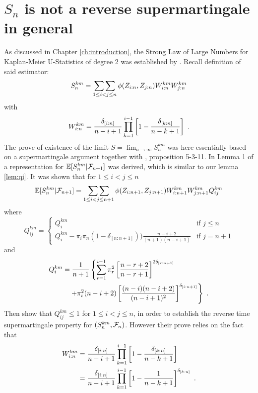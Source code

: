 \section{$S_n$ is not a reverse supermartingale in general} \label{sec:not_supermart}
As discussed in Chapter \ref{ch:introduction}, the Strong Law of Large Numbers for Kaplan-Meier U-Statistics of degree $2$ was established by \cite{bose1999strong}. Recall definition of said estimator: 
\begin{equation*}
	S_n^{km} = \mathop{\sum\sum}\limits_{1\leq i<j\leq n} \phi(Z_{i:n}, Z_{j:n}) W_{i:n}^{km} W_{j:n}^{km}
\end{equation*}
with
\begin{equation*}
	W_{i:n}^{km} = \frac{\delta_{[i:n]}}{n-i+1}\prod\limits_{k=1}^{i-1}\left[1-\frac{\delta_{[k:n]}}{n-k+1}\right]\textrm{ .}
\end{equation*}
The prove of existence of the limit $S = \lim_{n\to\infty} S_n^{km}$ was here essentially based on a supermartingale argument together with \cite{neveu1975discrete}, proposition 5-3-11. In Lemma 1 of \cite{bose1999strong} a representation for $\mathbb{E}[S_n^{km}| \mathcal{F}_{n+1}]$ was derived, which is similar to our lemma \ref{lem:qi}. It was shown that for $1\leq i<j\leq n$
$$\mathbb{E}[S_n^{km}|\mathcal{F}_{n+1}] = \mathop{\sum\sum}\limits_{1\leq i<j \leq n+1} \phi(Z_{i:n+1},Z_{j:n+1}) W_{i:n+1}^{km}W_{j:n+1}^{km}Q_{ij}^{km}$$
where 
\[Q_{ij}^{km} = \begin{cases} 
Q_i^{km} &\textrm{if } j\leq n \\
Q_i^{km} - \pi_i \pi_n (1-\delta_{[n:n+1]}))\frac{n-i+2}{(n+1)(n-i+1)} &\textrm{if } j=n+1
\end{cases}
\]
and
\begin{align*}
Q_i^{km} &= \frac{1}{n+1} \left\{ \sum\limits_{r=1}^{i-1} \pi_r^2 \left[ \frac{n-r+2}{n-r+1} \right]^{2\delta_{[r:n+1]}} \right.\\
		 & \quad \left. + \pi_i^2 (n-i+2) \left[\frac{(n-i)(n-i+2)}{(n-i+1)^2}\right]^{\delta_{[i:n+1]}} \right\}\textrm{ .}
\end{align*}
%
Then \cite{bose1999strong} show that $Q_{ij}^{km}\leq 1$ for $1\leq i<j\leq n$, in order to establish the reverse time supermartingale property for $(S_n^{km}, \mathcal{F}_n)$. However their prove relies on the fact that 
\begin{align*}
	W_{i:n}^{km} &= \frac{\delta_{[i:n]}}{n-i+1}\prod\limits_{k=1}^{i-1}\left[1-\frac{\delta_{[k:n]}}{n-k+1}\right] \\
				 &= \frac{\delta_{[i:n]}}{n-i+1}\prod\limits_{k=1}^{i-1}\left[1-\frac{1}{n-k+1}\right]^{\delta_{[k:n]}} \textrm{ .}
\end{align*}
